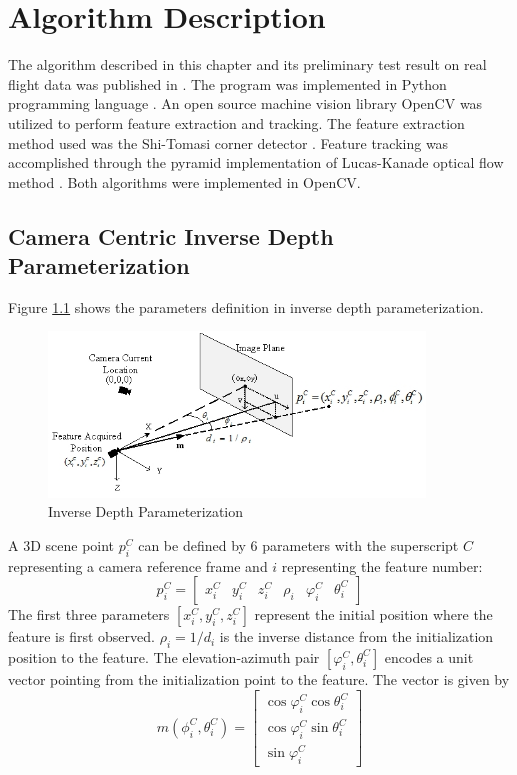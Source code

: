 \chapter{Algorithm Description}\label{ch:algorithm}

The algorithm described in this chapter and its preliminary test
result on real flight data was published in
\cite{zhang_obstacle_2012}. The program was implemented in Python
programming language \cite{_python_????}. An open source machine
vision library OpenCV was utilized to perform feature extraction and
tracking. The feature extraction method used was the Shi-Tomasi corner
detector \cite{shi_good_1994}. Feature tracking was accomplished
through the pyramid implementation of Lucas-Kanade optical flow method
\cite{bouguet_pyramidal_1999}. Both algorithms were implemented in
OpenCV. 

\section{Camera Centric Inverse Depth Parameterization}
Figure \ref{fig:algo1} shows the parameters definition in inverse
depth parameterization.

\begin{figure}[h]
\centering
\includegraphics[width=10cm, keepaspectratio=true]{./Figures/idp.jpg}
\caption{Inverse Depth Parameterization}
\label{fig:algo1}
\end{figure}

A 3D scene point $p_{i}^{C}$ can be defined by 6 parameters with the 
superscript $C$ representing a camera reference frame and $i$
representing the feature number:
\begin{equation}
p_{i}^{C}=\begin{bmatrix}
x_{i}^{C} & y_{i}^{C} & z_{i}^{C} & \rho _{i} & \varphi _{i}^{C} & 
\theta _{i}^{C} 
\end{bmatrix}
\end{equation}
The first three parameters $[x_{i}^{C}, y_{i}^{C}, z_{i}^{C}]$
represent the initial position where the feature is first observed.
$\rho_{i} = 1/d_i$ is the inverse distance from the initialization position
to the feature. The elevation-azimuth pair $[\varphi_{i}^{C},
\theta_{i}^{C}]$ encodes a unit vector pointing from the
initialization point to the feature. The vector is given by
\begin{equation}
\label{eq:m}
m(\phi_{i}^{C}, \theta_{i}^{C})=\begin{bmatrix}
\cos\varphi_{i}^{C}\cos\theta _{i}^{C} \\
\cos\varphi_{i}^{C}\sin\theta _{i}^{C} \\
\sin\varphi_{i}^{C}
\end{bmatrix}
\end{equation}

